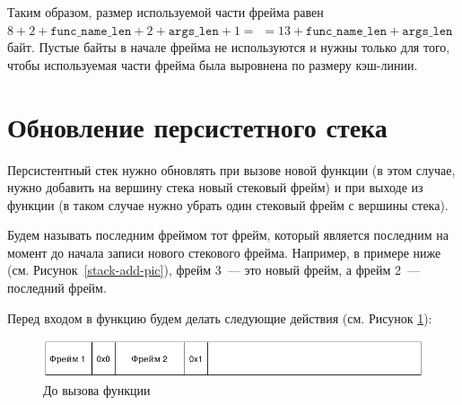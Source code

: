\documentclass[times,specification,annotation]{itmo-student-thesis}
\begin{document}
Таким образом, размер используемой части фрейма равен $8 + 2 + \texttt{func\_name\_len} + 2 + \texttt{args\_len} + 1 =$ $= 13 + \texttt{func\_name\_len} + \texttt{args\_len}$ байт. Пустые байты в начале фрейма не используются и нужны только для того, чтобы используемая части фрейма была выровнена по размеру кэш-линии.

\section{Обновление персистетного стека}

Персистентный стек нужно обновлять при вызове новой функции (в этом случае, нужно добавить на вершину стека новый стековый фрейм) и при выходе из функции (в таком случае нужно убрать один стековый фрейм с вершины стека).

Будем называть последним фреймом тот фрейм, который является последним на момент до начала записи нового стекового фрейма. Например, в примере ниже (см. Рисунок~\ref{stack-add-pic}), фрейм 3~--- это новый фрейм, а фрейм 2~--- последний фрейм.

Перед входом в функцию будем делать следующие действия (см. Рисунок \ref{before-function-call}):

\begin{figure}[H]
  \centering
  \caption{До вызова функции}
  \label{before-function-call}
  \includegraphics[width=\linewidth]{3.png}
\end{figure}
\end{document}
